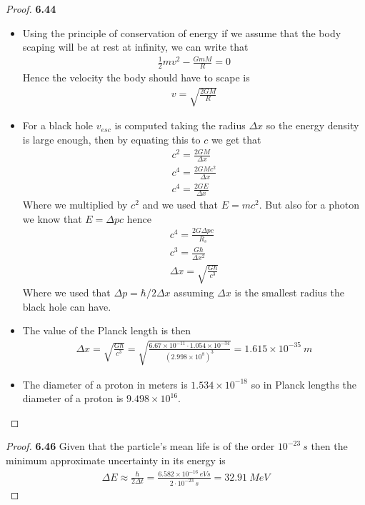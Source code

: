 \documentclass[11pt]{article}
\theoremstyle{definition}
\begin{document}
\begin{proof}{\textbf{6.44}}
\begin{itemize}
    \item [\textbf{(a)}] Using the principle of conservation of energy if we
    assume that the body scaping will be at rest at infinity, we can write that
    \begin{align*}
        \frac{1}{2}mv^2 - \frac{GmM}{R} = 0
    \end{align*}
    Hence the velocity the body should have to scape is
    \begin{align*}
        v = \sqrt{\frac{2GM}{R}}
    \end{align*}
    \item [\textbf{(b)}] For a black hole $v_{esc}$ is computed taking the
    radius $\Delta x$ so the energy density is large enough,
    then by equating this to $c$ we get that 
    \begin{align*}
        c^2 = \frac{2GM}{\Delta x}\\
        c^4 = \frac{2GMc^2}{\Delta x}\\
        c^4 = \frac{2GE}{\Delta x}
    \end{align*}
    Where we multiplied by $c^2$ and we used that $E = mc^2$. But also for
    a photon we know that $E = \Delta p c$ hence
    \begin{align*}
        c^4 = \frac{2G\Delta p c}{R_s}\\
        c^3 = \frac{G\hbar}{\Delta x^2}\\
        \Delta x = \sqrt{\frac{G\hbar}{c^3}}
    \end{align*}
    Where we used that $\Delta p = \hbar/2\Delta x$ assuming $\Delta x$ is the
    smallest radius the black hole can have.
    \item [\textbf{(c)}] The value of the Planck length is then
    \begin{align*}
        \Delta x = \sqrt{\frac{G\hbar}{c^3}}
        = \sqrt{\frac{6.67 \times 10^{-11}\cdot 1.054 \times 10^{-34}}
        {(2.998\times 10^8)^3}}
        = 1.615 \times 10^{-35}~m
    \end{align*}
    \item [\textbf{(d)}] The diameter of a proton in meters is
    $1.534\times 10^{-18}$ so in Planck lengths the diameter of a proton is
    $9.498 \times 10^{16}$.
\end{itemize}
\end{proof}
\cleardoublepage
\begin{proof}{\textbf{6.46}}
    Given that the particle's mean life is of the order $10^{-23}~s$ then 
    the minimum approximate uncertainty in its energy is 
    \begin{align*}
        \Delta E \approx \frac{\hbar}{2\Delta t}
        = \frac{6.582 \times 10^{-16}~eVs}{2\cdot 10^{-23}~s} 
        = 32.91~MeV
    \end{align*}
\end{proof}
\end{document}
